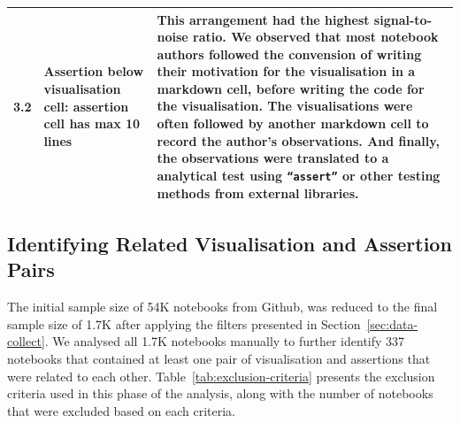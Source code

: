 \documentclass[acmsmall,screen,review,anonymous]{acmart}
\begin{document}
\begin{table}
\begin{tabular}{l p{} p{}}
    3.2 &
    Assertion below visualisation cell: assertion cell has max 10 lines &
    This arrangement had the highest signal-to-noise ratio. We observed that most notebook authors followed the convension of writing their motivation for the visualisation in a markdown cell, before writing the code for the visualisation. The visualisations were often followed by another markdown cell to record the author's observations. And finally, the observations were translated to a analytical test using \texttt{``assert''} or other testing methods from external libraries.\\
    \bottomrule
  \end{tabular}
  \label{tab:cell-arrangement}
\end{table}

\subsection{Identifying Related Visualisation and Assertion
Pairs}\label{sec:identify-related-pairs}

The initial sample size of 54K notebooks from Github, was reduced to the final sample size of 1.7K after applying the filters presented in Section~\ref{sec:data-collect}. We analysed all 1.7K notebooks manually to further identify 337 notebooks that contained at least one pair of visualisation and assertions that were related to each other. Table~\ref{tab:exclusion-criteria} presents the exclusion criteria used in this phase of the analysis, along with the number of notebooks that were excluded based on each criteria.
\end{document}
